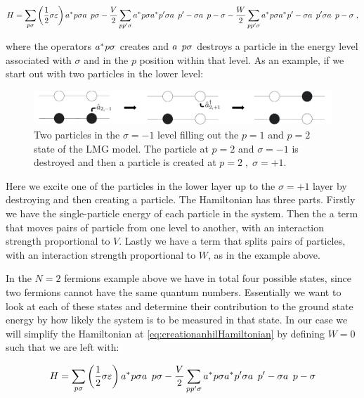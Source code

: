 \begin{equation} \label{eq:creationanhilHamiltonian}
    H = \sum_{p\sigma} \left ( \frac{1}{2} \sigma \varepsilon \right ) \hc{a}{p\sigma}\op{a}{p\sigma} - \frac{V}{2}\sum_{pp'\sigma} \hc{a}{p\sigma} \hc{a}{p'\sigma} \op{a}{p'-\sigma}\op{a}{p-\sigma} - \frac{W}{2} \sum_{pp'\sigma} \hc{a}{p\sigma} \hc{a}{p'-\sigma} \op{a}{p'\sigma}\op{a}{p-\sigma} \; , 
\end{equation}

where the operators $\hc{a}{p\sigma}$ creates and $\op{a}{p\sigma}$ destroys a particle in the energy level associated with $\sigma$ and in the $p$ position within that level. As an example, if we start out with two particles in the lower level:

\begin{figure}[H]
    \centering
    \includegraphics[width=\textwidth]{Figures/Drawn/Lipkin/lipkinexcited.pdf}
    \caption{Two particles in the $\sigma = -1$ level filling out the $p = 1$ and $p=2$ state of the LMG model. The particle at $p = 2$ and $\sigma = -1$ is destroyed and then a particle is created at $p=2 \; , \; \sigma = +1$.}
    \label{fig:lipkinbase}
\end{figure}

Here we excite one of the particles in the lower layer up to the $\sigma = +1$ layer by destroying and then creating a particle. The Hamiltonian has three parts. Firstly we have the single-particle energy of each particle in the system. Then the a term that moves pairs of particle from one level to another, with an interaction strength proportional to $V$. Lastly we have a term that splits pairs of particles, with an interaction strength proportional to $W$, as in the example above.

In the $N=2$ fermions example above we have in total four possible states, since two fermions cannot have the same quantum numbers. Essentially we want to look at each of these states and determine their contribution to the ground state energy by how likely the system is to be measured in that state. In our case we will simplify the Hamiltonian at \ref{eq:creationanhilHamiltonian} by defining $W=0$ such that we are left with:

\begin{equation}
     H = \sum_{p\sigma} \left ( \frac{1}{2} \sigma \varepsilon \right ) \hc{a}{p\sigma}\op{a}{p\sigma} - \frac{V}{2}\sum_{pp'\sigma} \hc{a}{p\sigma} \hc{a}{p'\sigma} \op{a}{p'-\sigma}\op{a}{p-\sigma}
\end{equation}

